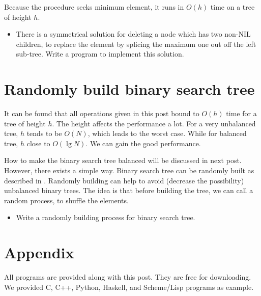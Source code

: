 \documentclass{article}
\begin{document}
Because the procedure seeks minimum element, it runs in $O(h)$ time on
a tree of height $h$.

\begin{Exercise}

\begin{itemize}
\item There is a symmetrical solution for deleting a node which has two
non-NIL children, to replace the element by splicing the maximum one out
off the left sub-tree. Write a program to implement this solution.
\end{itemize}

\end{Exercise}

\section{Randomly build binary search tree}
It can be found that all operations given in this post bound to $O(h)$
time for a tree of height $h$. The height affects the performance
a lot. For a very unbalanced tree, $h$ tends to be $O(N)$, which leads
to the worst case. While for balanced tree, $h$ close to $O(\lg N)$.
We can gain the good performance.

How to make the binary search tree
balanced will be discussed in next post. However, there exists a simple
way. Binary search tree can be randomly built as described in \cite{CLRS}.
Randomly building can help to avoid (decrease the possibility) unbalanced
binary trees. The idea is that before building the tree, we can call a random
process, to shuffle the elements.

\begin{Exercise}

\begin{itemize}
\item Write a randomly building process for binary search tree.
\end{itemize}

\end{Exercise}

\section{Appendix} \label{appendix}
All programs are provided along with this post. They are free for downloading.
We provided C, C++, Python, Haskell, and Scheme/Lisp programs as example.
\end{document}
